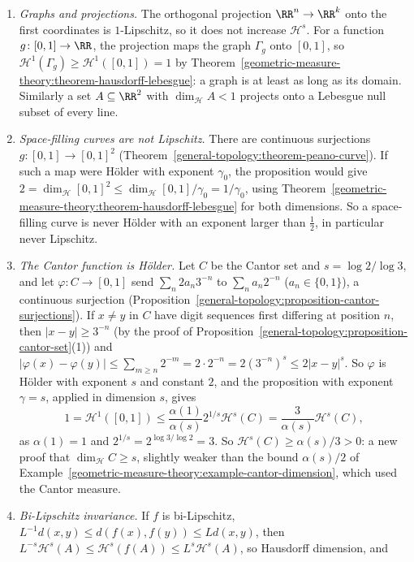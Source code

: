 \begin{example}\label{geometric-measure-theory:example-holder-images}
\begin{enumerate}
\item \emph{Graphs and projections.} The orthogonal projection $\RR^n \to \RR^k$ onto the first coordinates is $1$-Lipschitz, so it does not increase $\mathcal{H}^s$. For a function
$g \colon [0, 1] \to \RR$, the projection maps the graph $\Gamma_g$ onto $[0, 1]$, so $\mathcal{H}^1(\Gamma_g) \geq \mathcal{H}^1([0, 1]) = 1$ by Theorem~\ref{geometric-measure-theory:theorem-hausdorff-lebesgue}: a graph is at least
as long as its domain. Similarly a set $A \subseteq \RR^2$ with $\dim_{\mathcal{H}}A < 1$ projects onto a Lebesgue null subset of every line.
\item \emph{Space-filling curves are not Lipschitz.} There are continuous surjections $g \colon [0, 1] \to [0, 1]^2$ (Theorem~\ref{general-topology:theorem-peano-curve}). If such a map were H\"older with
exponent $\gamma_0$, the proposition would give $2 = \dim_{\mathcal{H}}[0, 1]^2 \leq \dim_{\mathcal{H}}[0, 1]/\gamma_0 = 1/\gamma_0$, using Theorem~\ref{geometric-measure-theory:theorem-hausdorff-lebesgue} for both dimensions. So a space-filling curve is
never H\"older with an exponent larger than $\frac12$, in particular never Lipschitz.
\item \emph{The Cantor function is H\"older.} Let $C$ be the Cantor set and $s = \log 2/\log 3$, and let $\varphi \colon C \to [0, 1]$ send $\sum_n2a_n3^{-n}$ to $\sum_na_n2^{-n}$ ($a_n \in \{0, 1\}$), a continuous
surjection (Proposition~\ref{general-topology:proposition-cantor-surjections}). If $x \neq y$ in $C$ have digit sequences first differing at position $n$, then $|x - y| \geq 3^{-n}$
(by the proof of Proposition~\ref{general-topology:proposition-cantor-set}(1)) and $|\varphi(x) - \varphi(y)| \leq \sum_{m \geq n}2^{-m} = 2 \cdot 2^{-n} = 2(3^{-n})^s \leq 2|x - y|^s$. So $\varphi$ is H\"older with exponent $s$
and constant $2$, and the proposition with exponent $\gamma = s$, applied in dimension $s$, gives
\[
1 = \mathcal{H}^1([0, 1]) \leq \frac{\alpha(1)}{\alpha(s)}2^{1/s}\mathcal{H}^s(C) = \frac{3}{\alpha(s)}\mathcal{H}^s(C),
\]
as $\alpha(1) = 1$ and $2^{1/s} = 2^{\log 3/\log 2} = 3$. So $\mathcal{H}^s(C) \geq \alpha(s)/3 > 0$: a new proof that $\dim_{\mathcal{H}}C \geq s$, slightly weaker than the bound $\alpha(s)/2$ of
Example~\ref{geometric-measure-theory:example-cantor-dimension}, which used the Cantor measure.
\item \emph{Bi-Lipschitz invariance.} If $f$ is bi-Lipschitz, $L^{-1}d(x, y) \leq d(f(x), f(y)) \leq Ld(x, y)$, then $L^{-s}\mathcal{H}^s(A) \leq \mathcal{H}^s(f(A)) \leq L^s\mathcal{H}^s(A)$, so Hausdorff dimension, and

\end{enumerate}
\end{example}
